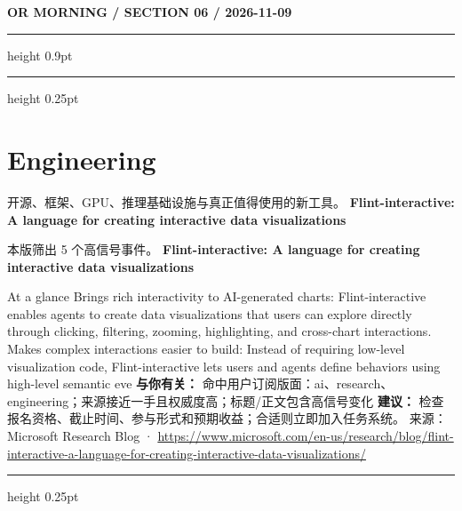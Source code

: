 \documentclass[10.5pt]{ctexart}
\begin{document}
\newpage
{\small\bfseries OR MORNING / SECTION 06 / 2026-11-09}
\vspace{2mm}
\hrule height 0.9pt
\vspace{1.5mm}
\hrule height 0.25pt
\vspace{4mm}
\section*{Engineering}
{\color{ormuted} 开源、框架、GPU、推理基础设施与真正值得使用的新工具。}
\vspace{2mm}
{\LARGE\bfseries Flint-interactive: A language for creating interactive data visualizations}\par
\vspace{1mm}
{\color{ormuted} 本版筛出 5 个高信号事件。}
\vspace{3mm}
{\Large\bfseries Flint-interactive: A language for creating interactive data visualizations}\par
At a glance Brings rich interactivity to AI-generated charts: Flint-interactive enables agents to create data visualizations that users can explore directly through clicking, filtering, zooming, highlighting, and cross-chart interactions. Makes complex interactions easier to build: Instead of requiring low-level visualization code, Flint-interactive lets users and agents define behaviors using high-level semantic eve
\textbf{与你有关：} 命中用户订阅版面：ai、research、engineering；来源接近一手且权威度高；标题/正文包含高信号变化
\textbf{建议：} 检查报名资格、截止时间、参与形式和预期收益；合适则立即加入任务系统。
{\footnotesize\color{ormuted} 来源：Microsoft Research Blog · \url{https://www.microsoft.com/en-us/research/blog/flint-interactive-a-language-for-creating-interactive-data-visualizations/}}
\vspace{4mm}
\hrule height 0.25pt
\vspace{3mm}
\end{document}
